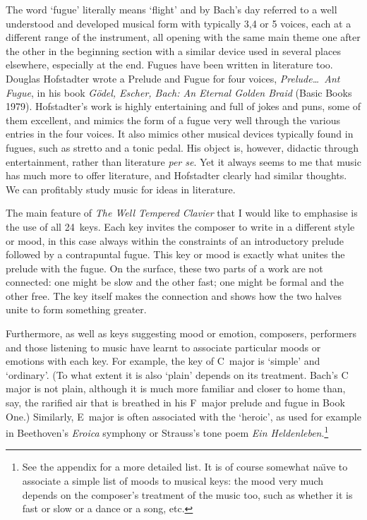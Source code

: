 The word `fugue' literally means `flight' and by Bach's day referred
to a well understood and developed musical form with typically 3,4 or
5 voices, each at a different range of the instrument, all opening with the
same main theme one after the other in the beginning section with a similar
device used in several places elsewhere, especially at the end.
Fugues have been written in literature too.  Douglas Hofstadter wrote
a Prelude and Fugue for four voices, \textit{Prelude\ldots\ Ant Fugue},
in his book \textit{Gödel, Escher, Bach: An Eternal Golden Braid} (Basic
Books 1979).  Hofstadter's work is highly entertaining and full of
jokes and puns, some of them excellent, and mimics the form of a fugue very well
through the various entries in the four voices.  It also mimics other musical
devices typically found in fugues, such as stretto and a tonic pedal.
His object is, however, didactic through entertainment, rather than literature
\textit{per se}.  Yet it always seems
to me that music has much more to offer literature, and Hofstadter
clearly had similar thoughts.  We can profitably study music for
ideas in literature.

The main feature of \textit{The Well Tempered Clavier}
that I would like to emphasise is the use of all 24~keys.  Each key
invites the composer to write in a different style or mood,
in this case always within the constraints of an introductory prelude
followed by a contrapuntal fugue.  This key or mood is exactly
what unites the prelude with the fugue.  On the surface, these
two parts of a work are not connected: one might be slow and the
other fast; one might be formal and the other free.  The key
itself makes the connection and shows how the two halves unite
to form something greater.

Furthermore, as well as keys suggesting mood or emotion, composers,
performers and those listening to music have learnt to associate
particular moods or emotions with each key.  For example, the key of
C~major is `simple' and `ordinary'.  (To what extent it is also
`plain' depends on its treatment.  Bach's C major is not plain, although
it is much more familiar and closer to home than, say, the rarified air
that is breathed in his F\sh\ major prelude and fugue in Book One.)
Similarly, E\fl\ major is often associated with the `heroic', as used for example
in Beethoven's \textit{Eroica} symphony or Strauss's tone
poem \textit{Ein Heldenleben}.\footnote{See the appendix for a more
detailed list. It is of course somewhat na\"{\i}ve to associate a
simple list of moods to musical keys: the mood very much depends on
the composer's treatment of the music too, such as whether it is fast
or slow or a dance or a song, etc.}

